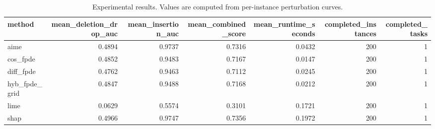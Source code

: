 \begin{table}[t]
\caption{Experimental results. Values are computed from per-instance perturbation curves.}
\label{tab:main_results_computed}
\centering
\begin{tabular}{lrrrrrr}
\toprule
method & mean\_deletion\_drop\_auc & mean\_insertion\_auc & mean\_combined\_score & mean\_runtime\_seconds & completed\_instances & completed\_tasks \\
\midrule
aime & 0.4894 & 0.9737 & 0.7316 & 0.0432 & 200 & 1 \\
cos\_fpde & 0.4852 & 0.9483 & 0.7167 & 0.0147 & 200 & 1 \\
diff\_fpde & 0.4762 & 0.9463 & 0.7112 & 0.0245 & 200 & 1 \\
hyb\_fpde\_grid & 0.4847 & 0.9488 & 0.7168 & 0.0212 & 200 & 1 \\
lime & 0.0629 & 0.5574 & 0.3101 & 0.1721 & 200 & 1 \\
shap & 0.4966 & 0.9747 & 0.7356 & 0.1972 & 200 & 1 \\
\bottomrule
\end{tabular}

\end{table}

